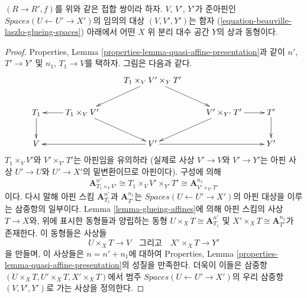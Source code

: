 \begin{lemma}
\label{lemma-glueing-quasi-affines}
$(R \to R', f)$를 위와 같은 접합 쌍이라 하자.
$V$, $V'$, $Y'$가 준아핀인 $\textit{Spaces}(U \leftarrow U' \to X')$의
임의의 대상 $(V, V', Y')$는 함자
(\ref{equation-beauville-laszlo-glueing-spaces}) 아래에서 어떤
$X$ 위 분리 대수 공간 $Y$의 상과 동형이다.
\end{lemma}

\begin{proof}
Properties, Lemma \ref{properties-lemma-quasi-affine-presentation}과 같이
$n'$, $T' \to Y'$ 및 $n_1$, $T_1 \to V$를 택하자. 그림은 다음과 같다.
$$
\xymatrix{
& &
T_1 \times_V V' \times_Y T' \ar[ld] \ar[rd] \\
T_1 \ar[d] &
T_1 \times_V V' \ar[l] \ar[dr] & &
V' \times_{Y'} T' \ar[r] \ar[dl] &
T' \ar[d] \\
V & &
V' \ar[rr] \ar[ll] & &
Y'
}
$$
$T_1 \times_V V'$와 $V' \times_{Y'} T'$는 아핀임을 유의하라
(실제로 사상 $V' \to V$와 $V' \to Y'$는 아핀 사상
$U' \to U$와 $U' \to X'$의 밑변환이므로 아핀이다). 구성에 의해
$$
\mathbf{A}^{n'}_{T_1 \times_V V'} \cong
T_1 \times_V V' \times_{Y'} T' \cong
\mathbf{A}^{n_1}_{V' \times_{Y'} T'}
$$
이다. 다시 말해 아핀 스킴 $\mathbf{A}^{n'}_{T_1}$과
$\mathbf{A}^{n_1}_{T'}$는 $\textit{Spaces}(U \leftarrow U' \to X')$의
아핀 대상을 이루는 삼중항의 일부이다. Lemma
\ref{lemma-glueing-affines}에 의해 아핀 스킴의 사상 $T \to X$와,
위에 표시한 동형들과 양립하는 동형
$U \times_X T \cong \mathbf{A}^{n'}_{T_1}$ 및
$X' \times_X T \cong \mathbf{A}^{n_1}_{T'}$가 존재한다. 이 동형들은
사상들
$$
U \times_X T \longrightarrow V
\quad\text{그리고}\quad
X' \times_X T \longrightarrow Y'
$$
을 만들며, 이 사상들은 $n = n' + n_1$에 대하여 Properties, Lemma
\ref{properties-lemma-quasi-affine-presentation}의 성질을 만족한다.
더욱이 이들은 삼중항
$(U \times_X T, U' \times_X T, X' \times_X T)$에서 범주
$\textit{Spaces}(U \leftarrow U' \to X')$의 우리 삼중항
$(V, V', Y')$로 가는 사상을 정의한다.


\end{proof}
